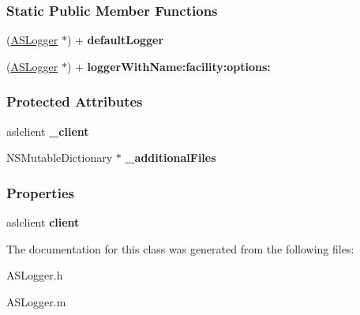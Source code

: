 \subsubsection*{Static Public Member Functions}
\begin{DoxyCompactItemize}
\item 
\hypertarget{interface_a_s_logger_ac6f40f771da99e39999e5d9abbfcb22d}{
(\hyperlink{interface_a_s_logger}{ASLogger} $\ast$) + {\bfseries defaultLogger}}
\label{interface_a_s_logger_ac6f40f771da99e39999e5d9abbfcb22d}

\item 
\hypertarget{interface_a_s_logger_a5ac022db9b01faa3d675e536c2ec646f}{
(\hyperlink{interface_a_s_logger}{ASLogger} $\ast$) + {\bfseries loggerWithName:facility:options:}}
\label{interface_a_s_logger_a5ac022db9b01faa3d675e536c2ec646f}

\end{DoxyCompactItemize}
\subsubsection*{Protected Attributes}
\begin{DoxyCompactItemize}
\item 
\hypertarget{interface_a_s_logger_ab96a381f9c301ab50a6a961b95620776}{
aslclient {\bfseries \_\-client}}
\label{interface_a_s_logger_ab96a381f9c301ab50a6a961b95620776}

\item 
\hypertarget{interface_a_s_logger_a3d82895e4935c9c3a4c7b0aed1c01f50}{
NSMutableDictionary $\ast$ {\bfseries \_\-additionalFiles}}
\label{interface_a_s_logger_a3d82895e4935c9c3a4c7b0aed1c01f50}

\end{DoxyCompactItemize}
\subsubsection*{Properties}
\begin{DoxyCompactItemize}
\item 
\hypertarget{interface_a_s_logger_a39dd3c2f877e4fa2d04c4a04a1a3ff4e}{
aslclient {\bfseries client}}
\label{interface_a_s_logger_a39dd3c2f877e4fa2d04c4a04a1a3ff4e}

\end{DoxyCompactItemize}


The documentation for this class was generated from the following files:\begin{DoxyCompactItemize}
\item 
ASLogger.h\item 
ASLogger.m\end{DoxyCompactItemize}
